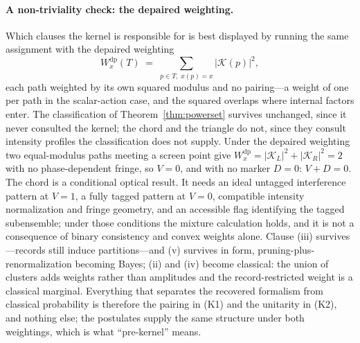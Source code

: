 \paragraph{A non-triviality check: the depaired weighting.} Which clauses the kernel is responsible for is best displayed by running the same assignment with the depaired weighting
\[
 W_x^{\mathrm{dp}}(T) \;=\; \sum_{p \in T,\; x(p) = x}|\mathcal{K}(p)|^2 ,
\]
each path weighted by its own squared modulus and no pairing---a weight of one per path in the scalar-action case, and the squared overlaps where internal factors enter. The classification of Theorem~\ref{thm:powerset} survives unchanged, since it never consulted the kernel; the chord and the triangle do not, since they consult intensity profiles the classification does not supply. Under the depaired weighting two equal-modulus paths meeting a screen point give $W^{\mathrm{dp}}_x = |\mathcal{K}_L|^2 + |\mathcal{K}_R|^2 = 2$ with no phase-dependent fringe, so $V = 0$, and with no marker $D = 0$: $V + D = 0$. The chord is a conditional optical result. It needs an ideal untagged interference pattern at $V = 1$, a fully tagged pattern at $V = 0$, compatible intensity normalization and fringe geometry, and an accessible flag identifying the tagged subensemble; under those conditions the mixture calculation holds, and it is not a consequence of binary consistency and convex weights alone. Clause (iii) survives---records still induce partitions---and (v) survives in form, pruning-plus-renormalization becoming Bayes; (ii) and (iv) become classical: the union of clusters adds weights rather than amplitudes and the record-restricted weight is a classical marginal. Everything that separates the recovered formalism from classical probability is therefore the pairing in (K1) and the unitarity in (K2), and nothing else; the postulates supply the same structure under both weightings, which is what ``pre-kernel'' means.

